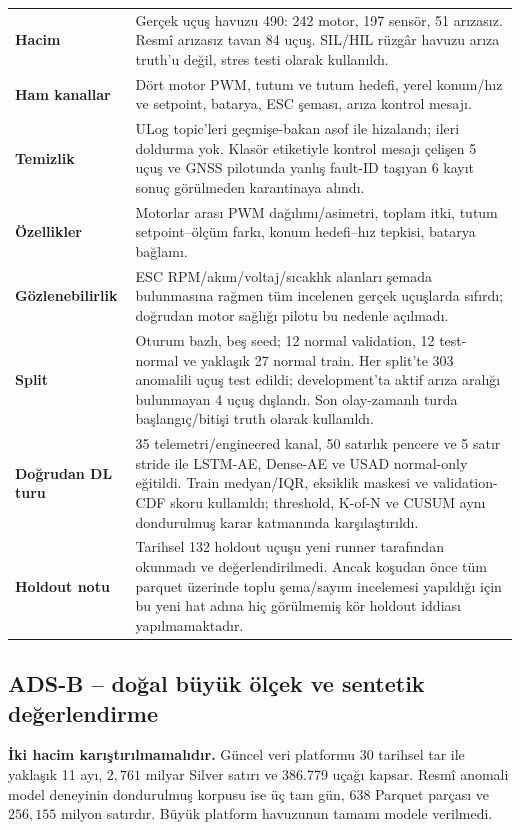\documentclass[10pt,a4paper]{article}
\newcommand{\code}[1]{\texttt{\detokenize{#1}}}
\begin{document}
\begin{tabularx}{\textwidth}{>{\bfseries}p{}X}
Hacim & Gerçek uçuş havuzu 490: 242 motor, 197 sensör, 51 arızasız. Resmî
arızasız tavan 84 uçuş. SIL/HIL rüzgâr havuzu arıza truth'u değil, stres testi
olarak kullanıldı. \\
Ham kanallar & Dört motor PWM, tutum ve tutum hedefi, yerel konum/hız ve
setpoint, batarya, ESC şeması, \code{rfly_ctrl_lxl} arıza kontrol mesajı. \\
Temizlik & ULog topic'leri geçmişe-bakan asof ile hizalandı; ileri doldurma yok.
Klasör etiketiyle kontrol mesajı çelişen 5 uçuş ve GNSS pilotunda yanlış fault-ID
taşıyan 6 kayıt sonuç görülmeden karantinaya alındı. \\
Özellikler & Motorlar arası PWM dağılımı/asimetri, toplam itki, tutum
setpoint--ölçüm farkı, konum hedefi--hız tepkisi, batarya bağlamı. \\
Gözlenebilirlik & ESC RPM/akım/voltaj/sıcaklık alanları şemada bulunmasına rağmen
tüm incelenen gerçek uçuşlarda sıfırdı; doğrudan motor sağlığı pilotu bu nedenle açılmadı. \\
Split & Oturum bazlı, beş seed; 12 normal validation, 12 test-normal ve yaklaşık
27 normal train. Her split'te 303 anomalili uçuş test edildi; development'ta aktif
arıza aralığı bulunmayan 4 uçuş dışlandı. Son olay-zamanlı turda
\code{rfly_ctrl_lxl} başlangıç/bitişi truth olarak kullanıldı. \\
Doğrudan DL turu & 35 telemetri/engineered kanal, 50 satırlık pencere ve 5 satır
stride ile LSTM-AE, Dense-AE ve USAD normal-only eğitildi. Train medyan/IQR,
eksiklik maskesi ve validation-CDF skoru kullanıldı; threshold, K-of-N ve CUSUM
aynı dondurulmuş karar katmanında karşılaştırıldı. \\
Holdout notu & Tarihsel 132 holdout uçuşu yeni runner tarafından okunmadı ve
değerlendirilmedi. Ancak koşudan önce tüm parquet üzerinde toplu şema/sayım
incelemesi yapıldığı için bu yeni hat adına hiç görülmemiş kör holdout iddiası
yapılmamaktadır. \\
\end{tabularx}

\subsection{ADS-B -- doğal büyük ölçek ve sentetik değerlendirme}

\begin{infobox}
\textbf{İki hacim karıştırılmamalıdır.} Güncel veri platformu 30 tarihsel tar ile
yaklaşık 11 ayı, $2{,}761$ milyar Silver satırı ve 386.779 uçağı kapsar. Resmî
anomali model deneyinin dondurulmuş korpusu ise üç tam gün, 638 Parquet parçası
ve $256{,}155$ milyon satırdır. Büyük platform havuzunun tamamı modele verilmedi.
\end{infobox}
\end{document}
